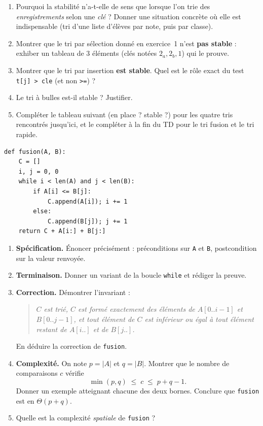 \documentclass[11pt,a4paper]{article}
\begin{document}
\begin{enumerate}[label=\arabic*.,leftmargin=*]
  \item Pourquoi la stabilité n'a-t-elle de sens que lorsque l'on trie des
        \emph{enregistrements} selon une \emph{clé} ? Donner une situation concrète où
        elle est indispensable (tri d'une liste d'élèves par note, puis par classe).
  \item Montrer que le tri par sélection donné en exercice~1 n'est \textbf{pas stable} :
        exhiber un tableau de $3$ éléments (clés notées $2_a, 2_b, 1$) qui le prouve.
  \item Montrer que le tri par insertion \textbf{est stable}. Quel est le rôle exact
        du test \texttt{t[j] > cle} (et non \texttt{>=}) ?
  \item Le tri à bulles est-il stable ? Justifier.
  \item Compléter le tableau suivant (en place ? stable ?) pour les quatre tris
        rencontrés jusqu'ici, et le compléter à la fin du TD pour le tri fusion et le
        tri rapide.
\end{enumerate}


\begin{lstlisting}
def fusion(A, B):
    C = []
    i, j = 0, 0
    while i < len(A) and j < len(B):
        if A[i] <= B[j]:
            C.append(A[i]); i += 1
        else:
            C.append(B[j]); j += 1
    return C + A[i:] + B[j:]
\end{lstlisting}

\begin{enumerate}[label=\arabic*.,leftmargin=*]
  \item \textbf{Spécification.} Énoncer précisément : préconditions sur \texttt{A} et
        \texttt{B}, postcondition sur la valeur renvoyée.
  \item \textbf{Terminaison.} Donner un variant de la boucle \texttt{while} et rédiger
        la preuve.
  \item \textbf{Correction.} Démontrer l'invariant :
        \begin{quote}
          \emph{$C$ est trié, $C$ est formé exactement des éléments de $A[0..i-1]$ et
          $B[0..j-1]$, et tout élément de $C$ est inférieur ou égal à tout élément
          restant de $A[i..]$ et de $B[j..]$.}
        \end{quote}
        En déduire la correction de \texttt{fusion}.
  \item \textbf{Complexité.} On note $p=|A|$ et $q=|B|$. Montrer que le nombre de
        comparaisons $c$ vérifie
        \[ \min(p,q) \;\le\; c \;\le\; p+q-1 .\]
        Donner un exemple atteignant chacune des deux bornes. Conclure que
        \texttt{fusion} est en $\Theta(p+q)$.
  \item Quelle est la complexité \emph{spatiale} de \texttt{fusion} ?
\end{enumerate}
\end{document}
